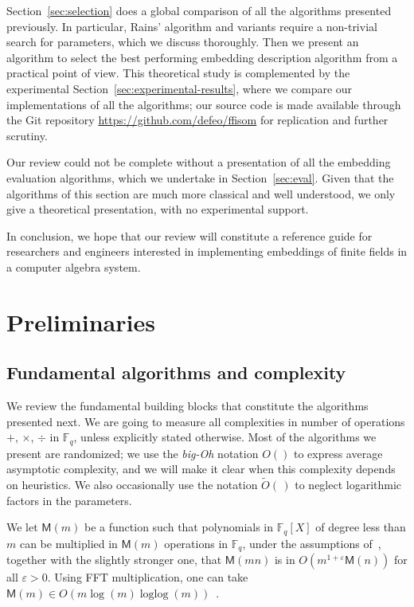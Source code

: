 \documentclass[12pt]{article}
\theoremstyle{plain}
\theoremstyle{definition}
\newcommand{\tildO}{\tilde{O}}
\DeclareMathOperator{\loglog}{loglog}
\def\F{\ensuremath{\mathbb{F}}}
\def\MM{\ensuremath{\mathsf{M}}}
\newcounter{algorithm}
\begin{document}
Section~\ref{sec:selection} does a global comparison of all the
algorithms presented previously. %
In particular, Rains' algorithm and variants require a non-trivial
search for parameters, which we discuss thoroughly. %
Then we present an algorithm to select the best performing embedding
description algorithm from a practical point of view. %
This theoretical study is complemented by the experimental
Section~\ref{sec:experimental-results}, where we compare our
implementations of all the algorithms; our source code is made
available through the Git repository
\url{https://github.com/defeo/ffisom} for replication and further
scrutiny.

Our review could not be complete without a presentation of all the
embedding evaluation algorithms, which we undertake in
Section~\ref{sec:eval}. %
Given that the algorithms of this section are much more classical and
well understood, we only give a theoretical presentation, with no
experimental support. %

In conclusion, we hope that our review will constitute a reference
guide for researchers and engineers interested in implementing
embeddings of finite fields in a computer algebra system.


\section{Preliminaries}
\label{sec:preliminaries}

\subsection{Fundamental algorithms and complexity}
\label{sec:fundamentalgo}
We review the fundamental building blocks that constitute the
algorithms presented next.  We are going to measure all complexities
in number of operations $+$, $\times$, $\div$ in $\F_q$, unless
explicitly stated otherwise. Most of the algorithms we present are
randomized; we use the \emph{big-Oh} notation $O()$ to express average
asymptotic complexity, and we will make it clear when this complexity
depends on heuristics. We also occasionally use the notation
$\tildO(\,)$ to neglect logarithmic factors in the parameters.

We let $\MM(m)$ be a function such that polynomials in $\F_q[X]$ of
degree less than $m$ can be multiplied in $\MM(m)$ operations in
$\F_q$, under the assumptions of~\cite[Ch.~8.3]{vzGG}, together with
the slightly stronger one, that $\MM(mn)$ is in $O(m^{1+\varepsilon}
\MM(n))$ for all $\varepsilon > 0$. Using FFT multiplication, one can
take $\MM(m)\in O(m\log(m) \loglog(m))$~\cite{cantor+kaltofen91}.
\end{document}
